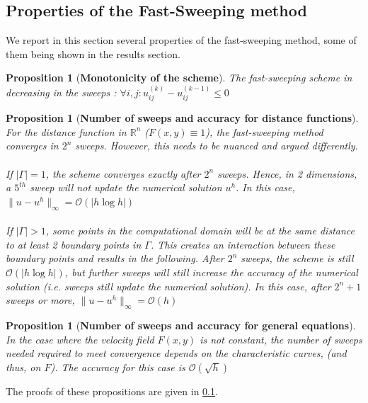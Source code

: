\documentclass[11pt]{article}
\newtheorem{prop}[theorem]{Proposition}
\theoremstyle{definition}
\theoremstyle{remark}
\newcommand{\R}{\mathbb{R}}
\begin{document}
\subsection{Properties of the Fast-Sweeping method}
We report in this section several properties of the fast-sweeping method, some of them being shown in the results section.
\begin{prop}[\textbf{Monotonicity of the scheme}]
The fast-sweeping scheme in decreasing in the sweeps : $\forall i,j:u^{(k)}_{ij}-u^{(k-1)}_{ij}\leq0$
\end{prop}
\begin{prop}[\textbf{Number of sweeps and accuracy for distance functions}]
\label{prop_distance_functions}
    For the distance function in $\R^n$ ($F(x,y)\equiv1$), the fast-sweeping method converges in $2^n$ sweeps. However, this needs to be nuanced and argued differently. \\ \\
    If $|\Gamma|=1$, the scheme converges exactly after $2^n$ sweeps. Hence, in 2 dimensions, a $5^{th}$ sweep will not update the numerical solution $u^h$. In this case, $\|u-u^h\|_{\infty}=\mathcal{O}(|h\log h|)$ \\ \\
    If $|\Gamma|>1$, some points in the computational domain will be at the same distance to at least 2 boundary points in $\Gamma$. This creates an interaction between these boundary points and results in the following. After $2^n$ sweeps, the scheme is still $\mathcal{O}(|h\log h|)$, but further sweeps will still increase the accuracy of the numerical solution (i.e. sweeps still update the numerical solution). In this case, after $2^n+1$ sweeps or more, $\|u-u^h\|_\infty=\mathcal{O}(h)$
\end{prop}

\begin{prop}[\textbf{Number of sweeps and accuracy for general equations}]
    In the case where the velocity field $F(x,y)$ is not constant, the number of sweeps needed required to meet convergence depends on the characteristic curves, (and thus, on $F$). The accuracy for this case is $\mathcal{O}(\sqrt{h})$
\end{prop}
\noindent The proofs of these propositions are given in \ref{}.
\end{document}
